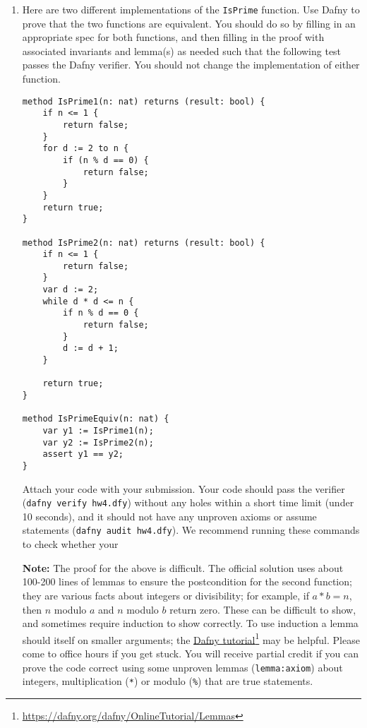 \documentclass{article}
\newcommand{\visiblehref}[2]{\href{#1}{#2}\footnote{\url{#1}}}
\begin{document}
\begin{enumerate}
\item
Here are two different implementations of the \texttt{IsPrime} function.
Use Dafny to prove that the two functions are equivalent.
You should do so by filling in an appropriate spec for both functions,
and then filling in the proof with associated invariants and lemma(s) as needed
such that the following test passes the Dafny verifier.
You should not change the implementation of either function.

\begin{verbatim}
method IsPrime1(n: nat) returns (result: bool) {
    if n <= 1 {
        return false;
    }
    for d := 2 to n {
        if (n % d == 0) {
            return false;
        }
    }
    return true;
}

method IsPrime2(n: nat) returns (result: bool) {
    if n <= 1 {
        return false;
    }
    var d := 2;
    while d * d <= n {
        if n % d == 0 {
            return false;
        }
        d := d + 1;
    }

    return true;
}

method IsPrimeEquiv(n: nat) {
    var y1 := IsPrime1(n);
    var y2 := IsPrime2(n);
    assert y1 == y2;
}
\end{verbatim}

Attach your code with your submission.
Your code should pass the verifier (\texttt{dafny verify hw4.dfy}) without any holes
within a short time limit (under 10 seconds),
and it should not have any unproven axioms or assume statements (\texttt{dafny audit hw4.dfy}).
We recommend running these commands to check whether your

\textbf{Note:}
The proof for the above is difficult.
The official solution uses about 100-200 lines of lemmas
to ensure the postcondition for the second function;
they are various facts about integers or divisibility;
for example, if $a * b = n$, then $n$ modulo $a$ and $n$ modulo $b$ return zero.
These can be difficult to show, and sometimes require induction to show correctly.
To use induction a lemma should itself on smaller arguments; the \visiblehref{https://dafny.org/dafny/OnlineTutorial/Lemmas}{Dafny tutorial} may be helpful.
Please come to office hours if you get stuck.
You will receive partial credit if you can prove the code correct using some unproven lemmas (\texttt{lemma{:axiom}}) about integers, multiplication (\texttt{*}) or modulo (\texttt{\%}) that are true statements.

\end{enumerate}
\end{document}

